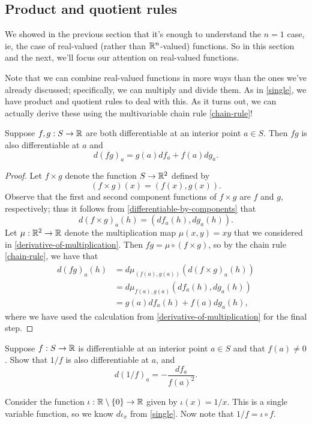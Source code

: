 \subsection{Product and quotient rules}

We showed in the previous section that it's enough to understand the $n = 1$ case, ie, the case of real-valued (rather than $\mathbb{R}^n$-valued) functions. So in this section and the next, we'll focus our attention on real-valued functions. 

Note that we can combine real-valued functions in more ways than the ones we've already discussed; specifically, we can multiply and divide them. As in \cref{single}, we have product and quotient rules to deal with this. As it turns out, we can actually derive these using the multivariable chain rule \ref{chain-rule}!

\begin{proposition} \label{product-rule} 
	Suppose $f, g : S \to \mathbb{R}$ are both differentiable at an interior point $a \in S$. Then $fg$ is also differentiable at $a$ and
	\[ d(fg)_a = g(a)df_a + f(a) dg_a. \]
\end{proposition}

\begin{proof}
	Let $f \times g$ denote the function $S \to \mathbb{R}^2$ defined by
	\[ (f \times g)(x) = (f(x), g(x)). \]
	Observe that the first and second component functions of $f \times g$ are $f$ and $g$, respectively; thus it follows from \cref{differentiable-by-components} that 
	\[ d(f \times g)_a(h) = (df_a(h), dg_a(h)). \]
	Let $\mu : \mathbb{R}^2 \to \mathbb{R}$ denote the multiplication map $\mu(x,y) = xy$ that we considered in \cref{derivative-of-multiplication}. Then $fg = \mu \circ (f \times g)$, so by the chain rule \ref{chain-rule}, we have that 
	\[ \begin{aligned} d(fg)_a(h) &= d\mu_{(f(a),g(a))}(d(f \times g)_a(h)) \\
	&= d\mu_{f(a),g(a)}(df_a(h), dg_a(h)) \\
	&= g(a) df_a(h) + f(a)dg_a(h), \end{aligned} \]
	where we have used the calculation from \cref{derivative-of-multiplication} for the final step. 
\end{proof}

\begin{exercise} \label{reciprocal-rule}
	Suppose $f : S \to \mathbb{R}$ is differentiable at an interior point $a \in S$ and that $f(a) \neq 0$. Show that $1/f$ is also differentiable at $a$, and
	\[ d(1/f)_a = -\frac{df_a}{f(a)^2}.  \]
	\begin{hint}
		Consider the function $\iota : \mathbb{R} \setminus \{0\} \to \mathbb{R}$ given by $\iota(x) = 1/x$. This is a single variable function, so we know $d\iota_x$ from \cref{single}. Now note that $1/f = \iota \circ f$. 
	\end{hint}
\end{exercise}

